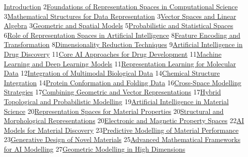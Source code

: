 \documentclass[
]{article}
\begin{document}
\hyperref[introduction]{Introduction}
2\hyperref[foundations-of-representation-spaces-in-computational-sci--ence]{Foundations
of Representation Spaces in Computational Science}
3\hyperref[mathematical-structures-for-data-representation]{Mathematical
Structures for Data Representation}
3\hyperref[vector-spaces-and-linear-algebra]{Vector Spaces and Linear
Algebra} 3\hyperref[geometric-and-spatial-models]{Geometric and Spatial
Models} 5\hyperref[probabilistic-and-statistical-spaces]{Probabilistic
and Statistical Spaces}
6\hyperref[role-of-representation-spaces-in-artificial-intelligence]{Role
of Representation Spaces in Artificial Intelligence}
8\hyperref[feature-encoding-and-transformation]{Feature Encoding and
Transformation}
8\hyperref[dimensionality-reduction-techniques]{Dimensionality Reduction
Techniques}
9\hyperref[artificial-intelligence-in-drug-discovery]{Artificial
Intelligence in Drug Discovery}
11\hyperref[core-ai-approaches-for-drug-development]{Core AI Approaches
for Drug Development}
11\hyperref[machine-learning-and-deep-learning-models]{Machine Learning
and Deep Learning Models}
11\hyperref[representation-learning-for-molecular-data]{Representation
Learning for Molecular Data}
12\hyperref[integration-of-multimodal-biological-data]{Integration of
Multimodal Biological Data}
14\hyperref[chemical-structure-integration]{Chemical Structure
Integration} 14\hyperref[protein-conformation-and-folding-data]{Protein
Conformation and Folding Data}
16\hyperref[cross-space-modelling-strategies]{Cross-Space Modelling
Strategies}
17\hyperref[combining-geometric-and-vector-representations]{Combining
Geometric and Vector Representations}
17\hyperref[hybrid-topological-and-probabilistic-modelling]{Hybrid
Topological and Probabilistic Modelling}
19\hyperref[artificial-intelligence-in-material-science]{Artificial
Intelligence in Material Science}
20\hyperref[representation-spaces-for-material-properties]{Representation
Spaces for Material Properties}
20\hyperref[structural-and-morphological-representations]{Structural and
Morphological Representations}
20\hyperref[electronic-and-magnetic-property-spaces]{Electronic and
Magnetic Property Spaces}
22\hyperref[ai-models-for-material-discovery]{AI Models for Material
Discovery}
23\hyperref[predictive-modelling-of-material-performance]{Predictive
Modelling of Material Performance}
23\hyperref[generative-design-of-novel-materials]{Generative Design of
Novel Materials}
25\hyperref[advanced-mathematical-frameworks-for-ai-modelling]{Advanced
Mathematical Frameworks for AI Modelling}
27\hyperref[geometric-modelling-in-high-dimensions]{Geometric Modelling
in High Dimensions}
\end{document}
